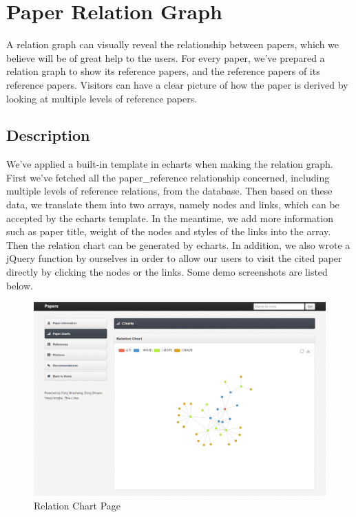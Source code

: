 \documentclass{book}
\begin{document}
\section {Paper Relation Graph}

A relation graph can visually reveal the relationship between papers, which we believe will be of great help to the users. For every paper, we've prepared a relation graph to show its reference papers, and the reference papers of its reference papers. Visitors can have a clear picture of how the paper is derived by looking at multiple levels of reference papers.

\subsection{Description}

We've applied a built-in template in echarts when making the relation graph. First we've fetched all the paper\_reference relationship concerned, including multiple levels of reference relations, from the database. Then based on these data, we translate them into two arrays, namely nodes and links, which can be accepted by the echarts template. In the meantime, we add more information such as paper title, weight of the nodes and styles of the links into the array. Then the relation chart can be generated by echarts. In addition, we also wrote a jQuery function by ourselves in order to allow our users to visit the cited paper directly by clicking the nodes or the links. Some demo screenshots are listed below.

\begin{figure}[H]
\centering
\includegraphics[scale=0.4]{img/zlt_rel_demo.png}
\caption{Relation Chart Page}
\end{figure}
\end{document}
